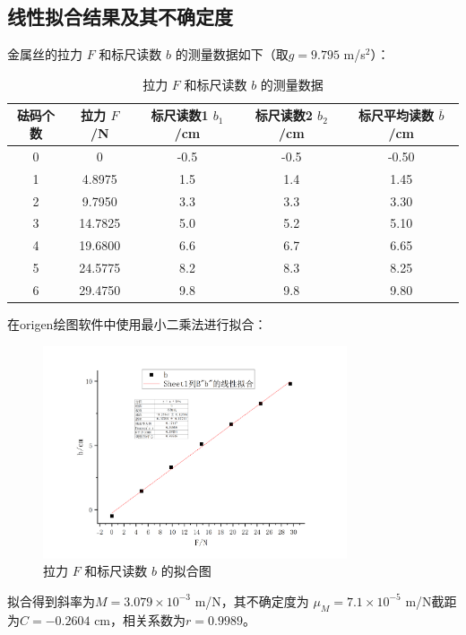 \documentclass[a4paper]{extarticle}
\begin{document}
    \subsection{线性拟合结果及其不确定度}
    \hspace{2em}
    金属丝的拉力 $F$ 和标尺读数 $b$ 的测量数据如下（取$g=9.795$ m/s$^2$）：
    \begin{table}[H]
        \centering
        \caption{拉力 $F$ 和标尺读数 $b$ 的测量数据}
        \begin{tabular}{ccccc}
            \toprule
            砝码个数 & 拉力 $F$ /N & 标尺读数1 $b_1$ /cm & 标尺读数2 $b_2$ /cm & 标尺平均读数 $\overline{b}$ /cm\\
            \midrule
            0 & 0 & -0.5 & -0.5 & -0.50\\
            1 & 4.8975 & 1.5 & 1.4 & 1.45\\
            2 & 9.7950 & 3.3 & 3.3 & 3.30\\
            3 & 14.7825 & 5.0 & 5.2 &5.10\\
            4 & 19.6800 & 6.6 & 6.7 & 6.65\\
            5 & 24.5775 & 8.2 & 8.3 & 8.25\\
            6 & 29.4750 & 9.8 & 9.8 & 9.80\\
            \bottomrule
        \end{tabular}
    \end{table}
    \hspace{2em}
    在origen绘图软件中使用最小二乘法进行拟合：
    \begin{figure}[H]
        \centering
        \includegraphics[width=0.8\textwidth]{nihe.png}
        \caption{拉力 $F$ 和标尺读数 $b$ 的拟合图}
    \end{figure}
    拟合得到斜率为$M=3.079\times10^{-3}$ m/N，其不确定度为 $\mu_M=7.1\times10^{-5}$ m/N截距为$C=-0.2604$ cm，相关系数为$r=0.9989$。
\end{document}

